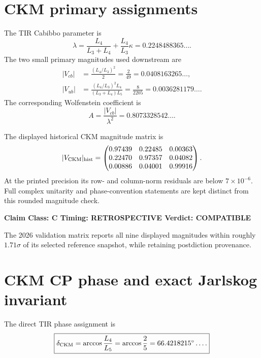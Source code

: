 \documentclass[11pt,a4paper,twoside]{book}
\theoremstyle{definition}
\newcommand{\vTwelveStatus}[3]{\par\noindent\textbf{Claim Class: #1 \quad Timing: #2 \quad Verdict: #3}\par}
\begin{document}
\section{CKM primary assignments}
The TIR Cabibbo parameter is
\begin{equation}
\boxed{
\lambda
=\frac{L_4}{L_3+L_4}
+\frac{L_4}{L_3}\kappa
=0.2248488365\ldots .
}
\label{eq:v12-ckm-lambda}
\end{equation}
The two small primary magnitudes used downstream are
\begin{align}
|V_{cb}|
&=\frac{(L_4/L_3)^2}{2}
=\frac2{49}
=0.0408163265\ldots,
\label{eq:v12-ckm-vcb}\\
|V_{ub}|
&=\frac{(L_4/L_3)^2L_4}{(L_3+L_4)L_5}
=\frac8{2205}
=0.0036281179\ldots .
\label{eq:v12-ckm-vub}
\end{align}
The corresponding Wolfenstein coefficient is
\begin{equation}
A=\frac{|V_{cb}|}{\lambda^2}
=0.8073328542\ldots .
\label{eq:v12-ckm-A}
\end{equation}

The displayed historical CKM magnitude matrix is
\begin{equation}
|V_{\rm CKM}|_{\rm hist}
=\begin{pmatrix}
0.97439 & 0.22485 & 0.00363\\
0.22470 & 0.97357 & 0.04082\\
0.00886 & 0.04001 & 0.99916
\end{pmatrix}.
\label{eq:v12-ckm-magnitude-matrix}
\end{equation}
At the printed precision its row- and column-norm residuals are below
$7\times10^{-6}$.  Full complex unitarity and phase-convention statements are
kept distinct from this rounded magnitude check.

\vTwelveStatus{C}{RETROSPECTIVE}{COMPATIBLE}
The 2026 validation matrix reports all nine displayed magnitudes within roughly
$1.71\sigma$ of its selected reference snapshot, while retaining postdiction
provenance.

\section{CKM CP phase and exact Jarlskog invariant}
The direct TIR phase assignment is
\begin{equation}
\boxed{
\delta_{\rm CKM}
=\arccos\frac{L_4}{L_5}
=\arccos\frac25
=66.4218215^\circ\ldots .
}
\label{eq:v12-ckm-delta}
\end{equation}
\end{document}
